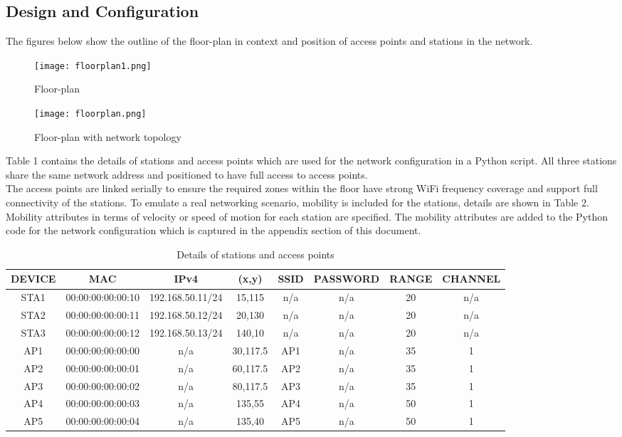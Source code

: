 \documentclass{article}
\begin{document}
\subsection{Design and Configuration}
The figures below show the outline of the floor-plan in context and position of access points and stations in the network.
    	\begin{figure}[h]
		\centering
        		\texttt{[image: floorplan1.png]}
        		\caption{Floor-plan}
        		\label{fig:t1-1}
        		\endminipage
        		\texttt{[image: floorplan.png]}
        		\caption{Floor-plan with network topology}
       		\label{fig:t1-2}
       		\endminipage
    	\end{figure} 
\par Table 1 contains the details of stations and access points which are used for the network configuration in a Python script. All three stations share the same network address and positioned to have full access to access points. \\ The access points are linked serially to ensure the required zones within the floor have strong WiFi frequency coverage and support full connectivity of the stations. To emulate a real networking scenario, mobility is included for the stations, details are shown in Table 2. Mobility attributes in terms of velocity or speed of motion for each station are specified. The mobility attributes are added to the Python code for the network configuration which is captured in the appendix section of this document.
  	\begin{table}[h]
		\small
		\centering
        		\begin{tabular}{|c|c|c|c|c|c|c|c|}
        			\hline
        			DEVICE & MAC & IPv4 & (x,y) & SSID & PASSWORD & RANGE & CHANNEL\\
        			\hline
        			STA1 & 00:00:00:00:00:10 & 192.168.50.11/24 & 15,115 & n/a & n/a & 20 & n/a \\
        			STA2 & 00:00:00:00:00:11 & 192.168.50.12/24 & 20,130 & n/a & n/a & 20 & n/a \\
       			STA3 & 00:00:00:00:00:12 & 192.168.50.13/24 & 140,10 & n/a & n/a & 20 & n/a \\
        			AP1 & 00:00:00:00:00:00 & n/a & 30,117.5 & AP1 & n/a & 35 & 1 \\
        			AP2 & 00:00:00:00:00:01 & n/a & 60,117.5 & AP2 & n/a & 35 & 1 \\
        			AP3 & 00:00:00:00:00:02 & n/a & 80,117.5 & AP3 & n/a & 35 & 1 \\
        			AP4 & 00:00:00:00:00:03 & n/a & 135,55 & AP4 & n/a & 50 & 1 \\
        			AP5 & 00:00:00:00:00:04 & n/a & 135,40 & AP5 & n/a & 50 & 1 \\
        			\hline
        		\end{tabular}
        \caption{Details of stations and access points}
        \label{tab:1}
    	\end{table}
\end{document}
